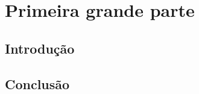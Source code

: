 \documentclass[a4paper, openany]{book}
\begin{document}
	
	\renewcommand{\contentsname}{Índice}
	\tableofcontents
	\part{Primeira grande parte}
	\chapter*{Introdução}
		\lipsum
	

	\appendix
	\chapter{Conclusão}
		\lipsum
\end{document}
